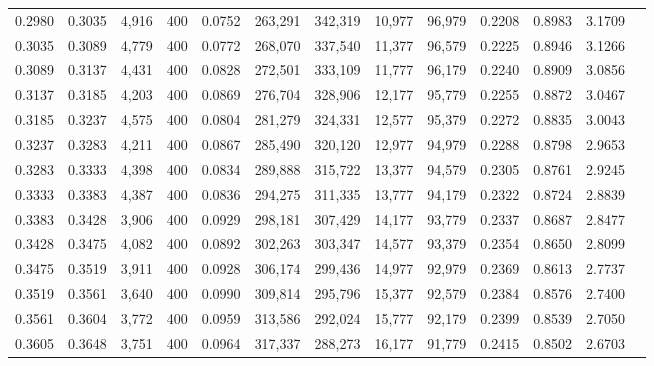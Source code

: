 \begin{tabular}{rrrrrrrrrrrrr}
0.2980 & 0.3035 &  4,916 &   400 &                                     0.0752 & 263,291 & 342,319 &  10,977 &  96,979 & 0.2208 & 0.8983 & 3.1709 \\
0.3035 & 0.3089 &  4,779 &   400 &                                     0.0772 & 268,070 & 337,540 &  11,377 &  96,579 & 0.2225 & 0.8946 & 3.1266 \\
0.3089 & 0.3137 &  4,431 &   400 &                                     0.0828 & 272,501 & 333,109 &  11,777 &  96,179 & 0.2240 & 0.8909 & 3.0856 \\
0.3137 & 0.3185 &  4,203 &   400 &                                     0.0869 & 276,704 & 328,906 &  12,177 &  95,779 & 0.2255 & 0.8872 & 3.0467 \\
0.3185 & 0.3237 &  4,575 &   400 &                                     0.0804 & 281,279 & 324,331 &  12,577 &  95,379 & 0.2272 & 0.8835 & 3.0043 \\
0.3237 & 0.3283 &  4,211 &   400 &                                     0.0867 & 285,490 & 320,120 &  12,977 &  94,979 & 0.2288 & 0.8798 & 2.9653 \\
0.3283 & 0.3333 &  4,398 &   400 &                                     0.0834 & 289,888 & 315,722 &  13,377 &  94,579 & 0.2305 & 0.8761 & 2.9245 \\
0.3333 & 0.3383 &  4,387 &   400 &                                     0.0836 & 294,275 & 311,335 &  13,777 &  94,179 & 0.2322 & 0.8724 & 2.8839 \\
0.3383 & 0.3428 &  3,906 &   400 &                                     0.0929 & 298,181 & 307,429 &  14,177 &  93,779 & 0.2337 & 0.8687 & 2.8477 \\
0.3428 & 0.3475 &  4,082 &   400 &                                     0.0892 & 302,263 & 303,347 &  14,577 &  93,379 & 0.2354 & 0.8650 & 2.8099 \\
0.3475 & 0.3519 &  3,911 &   400 &                                     0.0928 & 306,174 & 299,436 &  14,977 &  92,979 & 0.2369 & 0.8613 & 2.7737 \\
0.3519 & 0.3561 &  3,640 &   400 &                                     0.0990 & 309,814 & 295,796 &  15,377 &  92,579 & 0.2384 & 0.8576 & 2.7400 \\
0.3561 & 0.3604 &  3,772 &   400 &                                     0.0959 & 313,586 & 292,024 &  15,777 &  92,179 & 0.2399 & 0.8539 & 2.7050 \\
0.3605 & 0.3648 &  3,751 &   400 &                                     0.0964 & 317,337 & 288,273 &  16,177 &  91,779 & 0.2415 & 0.8502 & 2.6703 \\

\end{tabular}
